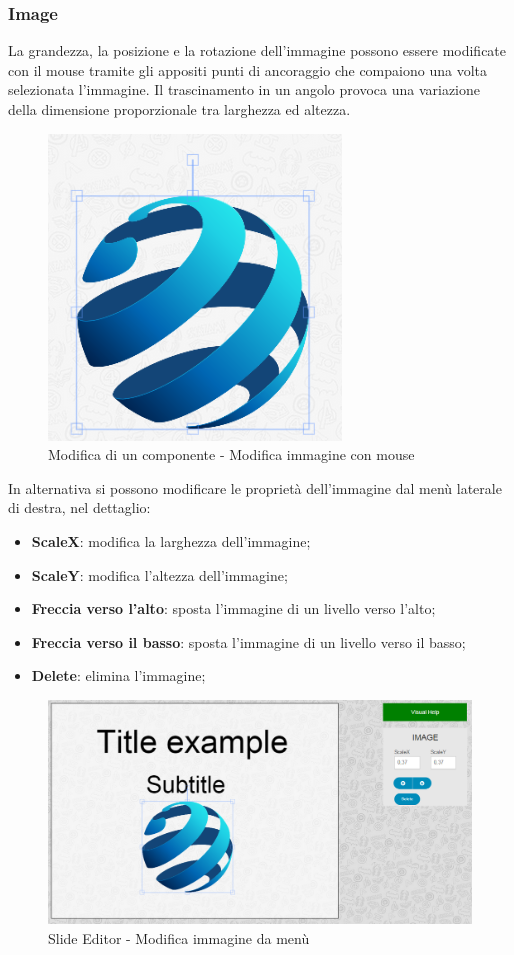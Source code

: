 		
\newpage 

\subsubsection{Image}
La grandezza, la posizione e la rotazione dell'immagine possono essere modificate con il mouse tramite gli appositi punti di ancoraggio che compaiono una volta selezionata l'immagine. Il trascinamento in un angolo provoca una variazione della dimensione proporzionale tra larghezza ed altezza.

\begin{figure}[H] 
	\centering 
	\includegraphics[scale=0.80] {img/img_anchor.png}
	\caption{Modifica di un componente - Modifica immagine con mouse} 
\end{figure}

\noindent In alternativa si possono modificare le proprietà dell'immagine dal menù laterale di destra, nel dettaglio:

		\begin{itemize}
			\item \textbf{ScaleX}: modifica la larghezza dell'immagine;
			\item \textbf{ScaleY}: modifica l'altezza dell'immagine;
			\item \textbf{Freccia verso l'alto}: sposta l'immagine di un livello verso l'alto;
			\item \textbf{Freccia verso il basso}: sposta l'immagine di un livello verso il basso;
			\item \textbf{Delete}: elimina l'immagine;
		\end{itemize}
		
\begin{figure}[H] 
	\centering 
	\includegraphics[scale=0.40] {img/img_edit.png}
	\caption{Slide Editor - Modifica immagine da menù} 
\end{figure}	


